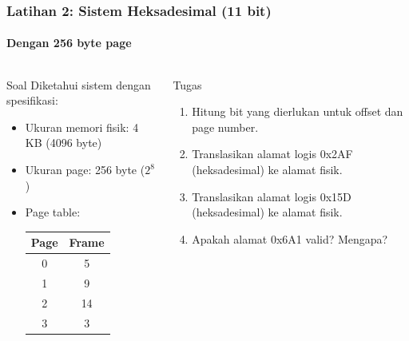 \documentclass[t,aspectratio=169,xcolor=dvipsnames]{beamer}
\begin{document}
\begin{frame}
    \frametitle{Latihan 2: Sistem Heksadesimal (11 bit)}
    \framesubtitle{Dengan 256 byte page}
    \scriptsize

    \begin{columns}[T]
        \begin{block}{Soal}
            Diketahui sistem dengan spesifikasi:
            \begin{itemize}
                \item Ukuran memori fisik: 4 KB (4096 byte)
                \item Ukuran page: 256 byte ($2^8$)
                \item Page table:
                \begin{center}
                \begin{tabular}{|c|c|}
                    \hline
                    \textbf{Page} & \textbf{Frame} \\
                    \hline
                    0 & 5 \\
                    \hline
                    1 & 9 \\
                    \hline
                    2 & 14 \\
                    \hline
                    3 & 3 \\
                    \hline
                \end{tabular}
                \end{center}
            \end{itemize}
        \end{block}

        \begin{alertblock}{Tugas}
            \begin{enumerate}
                \item Hitung bit yang dierlukan untuk offset dan page number.
                \item Translasikan alamat logis 0x2AF (heksadesimal) ke alamat fisik.
                \item Translasikan alamat logis 0x15D (heksadesimal) ke alamat fisik.
                \item Apakah alamat 0x6A1 valid? Mengapa?
            \end{enumerate}
        \end{alertblock}
    \end{columns}
\end{frame}
\end{document}
